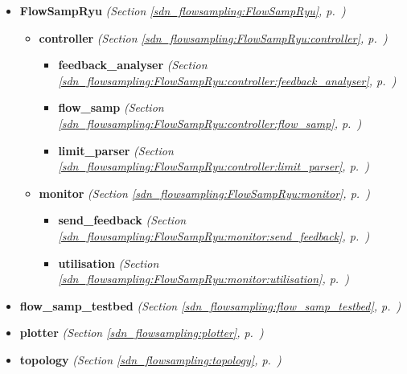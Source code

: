 \begin{itemize}
\setlength{\parskip}{0ex}
\item \textbf{FlowSampRyu}
  \textit{(Section \ref{sdn_flowsampling:FlowSampRyu}, p.~\pageref{sdn_flowsampling:FlowSampRyu})}

  \begin{itemize}
\setlength{\parskip}{0ex}
    \item \textbf{controller}
  \textit{(Section \ref{sdn_flowsampling:FlowSampRyu:controller}, p.~\pageref{sdn_flowsampling:FlowSampRyu:controller})}

      \begin{itemize}
    \setlength{\parskip}{0ex}
        \item \textbf{feedback\_analyser}
  \textit{(Section \ref{sdn_flowsampling:FlowSampRyu:controller:feedback_analyser}, p.~\pageref{sdn_flowsampling:FlowSampRyu:controller:feedback_analyser})}

        \item \textbf{flow\_samp}
  \textit{(Section \ref{sdn_flowsampling:FlowSampRyu:controller:flow_samp}, p.~\pageref{sdn_flowsampling:FlowSampRyu:controller:flow_samp})}

        \item \textbf{limit\_parser}
  \textit{(Section \ref{sdn_flowsampling:FlowSampRyu:controller:limit_parser}, p.~\pageref{sdn_flowsampling:FlowSampRyu:controller:limit_parser})}

      \end{itemize}
    \item \textbf{monitor}
  \textit{(Section \ref{sdn_flowsampling:FlowSampRyu:monitor}, p.~\pageref{sdn_flowsampling:FlowSampRyu:monitor})}

      \begin{itemize}
    \setlength{\parskip}{0ex}
        \item \textbf{send\_feedback}
  \textit{(Section \ref{sdn_flowsampling:FlowSampRyu:monitor:send_feedback}, p.~\pageref{sdn_flowsampling:FlowSampRyu:monitor:send_feedback})}

        \item \textbf{utilisation}
  \textit{(Section \ref{sdn_flowsampling:FlowSampRyu:monitor:utilisation}, p.~\pageref{sdn_flowsampling:FlowSampRyu:monitor:utilisation})}

      \end{itemize}
  \end{itemize}
\item \textbf{flow\_samp\_testbed}
  \textit{(Section \ref{sdn_flowsampling:flow_samp_testbed}, p.~\pageref{sdn_flowsampling:flow_samp_testbed})}

\item \textbf{plotter}
  \textit{(Section \ref{sdn_flowsampling:plotter}, p.~\pageref{sdn_flowsampling:plotter})}

\item \textbf{topology}
  \textit{(Section \ref{sdn_flowsampling:topology}, p.~\pageref{sdn_flowsampling:topology})}

\end{itemize}


